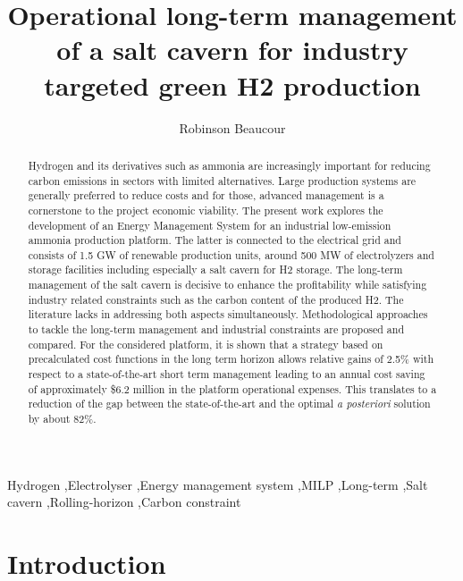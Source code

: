 \documentclass[authoryear,preprint,12pt]{elsarticle}
\begin{document}
\title{Operational long-term management of a salt cavern for industry targeted green H2 production}

\author{Robinson Beaucour}

\address{CEA}

\begin{abstract}
    \small
    Hydrogen and its derivatives such as ammonia are increasingly important for reducing carbon emissions in sectors with limited alternatives. Large production systems are generally preferred to reduce costs and for those, advanced management is a cornerstone to the project economic viability.
    The present work explores the development of an Energy Management System for an industrial low-emission ammonia production platform. The latter is connected to the electrical grid and consists of 1.5 GW of renewable production units, around 500 MW of electrolyzers and storage facilities including especially a salt cavern for H2 storage. The long-term management of the salt cavern is decisive to enhance the profitability while satisfying industry related constraints such as the carbon content of the produced H2. The literature lacks in addressing both aspects simultaneously. 
    Methodological approaches to tackle the long-term management and industrial constraints are proposed and compared. For the considered platform, it is shown that a strategy based on precalculated cost functions in the long term horizon allows relative gains of 2.5\% with respect to a state-of-the-art short term management leading to an annual cost saving of approximately \$6.2 million in the platform operational expenses. This translates to a reduction of the gap between the state-of-the-art and the optimal \textit{a posteriori} solution by about 82\%.

\end{abstract}

\begin{keyword}
Hydrogen \sep Electrolyser \sep Energy management system \sep MILP \sep Long-term \sep Salt cavern \sep Rolling-horizon \sep Carbon constraint 
\end{keyword}

\maketitle

\clearpage
\section{Introduction}
\label{Intro}
\end{document}

